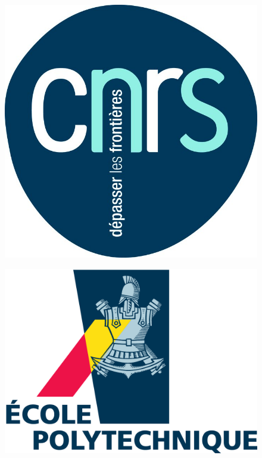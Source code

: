 \documentclass{beamer}
\begin{document}
{\begin{minipage}{0.45\textwidth}
\begin{minipage}{0.45\textwidth}
\begin{figure}
			\includegraphics[width=\textwidth]{Figures/logocnrs}
		\end{figure}
		\begin{figure}
			\centering
			\includegraphics[width=\textwidth]{Figures/logo_X}
		\end{figure}
		\end{minipage}		
	\end{minipage}
}
\end{document}
